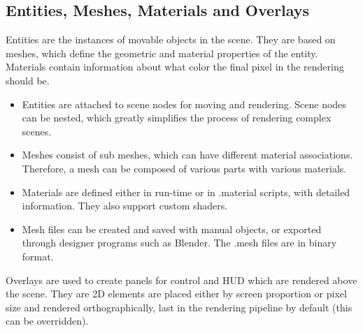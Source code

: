 \subsection{Entities, Meshes, Materials and Overlays}
Entities are the instances of movable objects in the scene. They are based on meshes, which define the geometric and material properties of the entity. Materials contain information about what color the final pixel in the rendering should be. 
\begin{itemize}
\item Entities are attached to scene nodes for moving and rendering. Scene nodes can be nested, which greatly simplifies the process of rendering complex scenes.
\item Meshes consist of sub meshes, which can have different material associations. Therefore, a mesh can be composed of various parts with various materials.
\item Materials are defined either in run-time or in .material scripts, with detailed information. They also support custom shaders.
\item Mesh files can be created and saved with manual objects, or exported through designer programs such as Blender. The .mesh files are in binary format.
\end{itemize}
Overlays are used to create panels for control and HUD which are rendered above the scene. They are 2D elements are placed either by screen proportion or pixel size and rendered orthographically, last in the rendering pipeline by default (this can be overridden).
